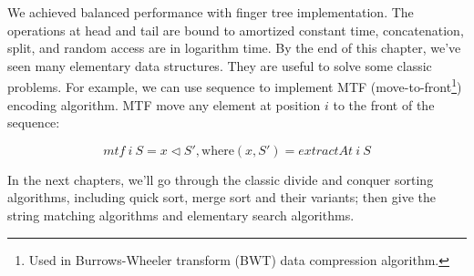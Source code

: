 \documentclass[b5paper]{article}
\begin{document}
We achieved balanced performance with finger tree implementation. The operations at head and tail are bound to amortized constant time, concatenation, split, and random access are in logarithm time\cite{hackage-ftr}. By the end of this chapter, we've seen many elementary data structures. They are useful to solve some classic problems. For example, we can use sequence to implement MTF (move-to-front\footnote{Used in Burrows-Wheeler transform (BWT) data compression algorithm.}) encoding algorithm\cite{mtf-wiki}. MTF move any element at position $i$ to the front of the sequence:

\[
mtf\ i\ S = x \lhd S', \text{where}(x, S') = \textit{extractAt}\ i\ S
\]

In the next chapters, we'll go through the classic divide and conquer sorting algorithms, including quick sort, merge sort and their variants; then give the string matching algorithms and elementary search algorithms.

\begin{Exercise}
\end{Exercise}
\end{document}
